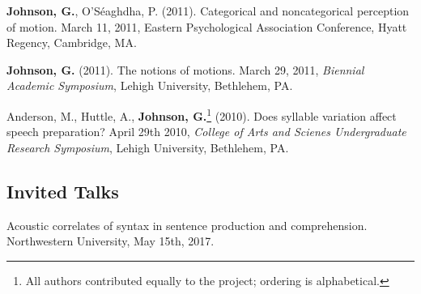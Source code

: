 \textbf{Johnson, G.}, O'S\'eaghdha, P. (2011). Categorical and noncategorical perception of motion. March 11, 2011, Eastern Psychological Association Conference, Hyatt Regency, Cambridge, MA.



\textbf{Johnson, G.} (2011). The notions of motions. March 29, 2011, \textit{Biennial Academic Symposium}, Lehigh University, Bethlehem, PA.



Anderson, M., Huttle, A., \textbf{Johnson, G.}\footnote{All authors contributed equally to the project; ordering is alphabetical.} (2010). Does syllable variation affect speech preparation? April 29th 2010, \textit{College of Arts and Scienes Undergraduate Research Symposium}, Lehigh University, Bethlehem, PA.

\subsection*{Invited Talks}

Acoustic correlates of syntax in sentence production and comprehension. Northwestern University, May 15th, 2017.